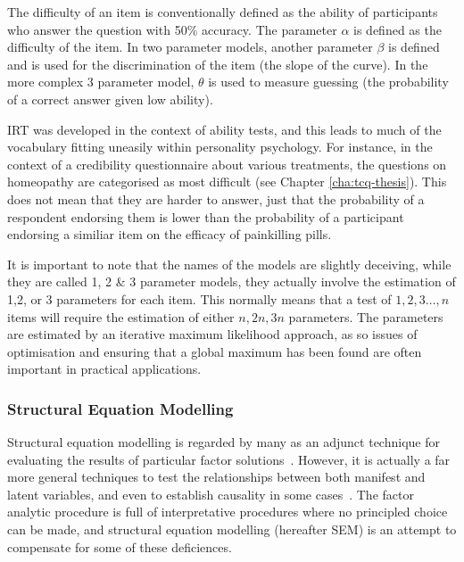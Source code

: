 The difficulty of an item is conventionally defined as the ability of participants who answer the question with 50\% accuracy. The parameter $\alpha$ is defined as the difficulty of the item. In two parameter models, another parameter $\beta$ is defined and is used for the discrimination of the item (the slope of the curve). In the more complex 3 parameter model, $\theta$ is used to measure guessing (the probability of a correct answer given low ability)\cite{van1997handbook}.

IRT was developed in the context of ability tests, and this leads to much of the vocabulary fitting uneasily within personality psychology. For instance, in the context of a credibility questionnaire about various treatments, the questions on homeopathy are categorised as most difficult (see Chapter \ref{cha:tcq-thesis}). This does not mean that they are harder to answer, just that the probability of a respondent endorsing them is lower than the probability of a participant endorsing a similiar item on the efficacy of painkilling pills.


It is important to note that the names of the models are slightly deceiving, while they are called 1, 2 \& 3 parameter models, they actually involve the estimation of 1,2, or 3 parameters for each item. This normally means that a test of ${1,2,3\ldots, n}$ items will require the estimation of either ${n, 2n, 3n}$ parameters. The parameters are estimated by an iterative maximum likelihood approach, as so issues of optimisation and ensuring that a global maximum has been found are often important in practical applications\cite{gill2002bayesian}.


\subsubsection{Structural Equation Modelling}
\label{sec:struct-equat-model}

Structural equation modelling is regarded by many as an adjunct technique for evaluating the results of particular factor solutions~\cite{fabrigar1999evaluating}. However, it is actually a far more general techniques to test the relationships between both manifest and latent variables, and even to establish causality in some cases~\cite{pearl1998graphs}. The factor analytic procedure is full of interpretative procedures where no principled choice can be made, and structural equation modelling (hereafter SEM) is an attempt to compensate for some of these deficiences.

